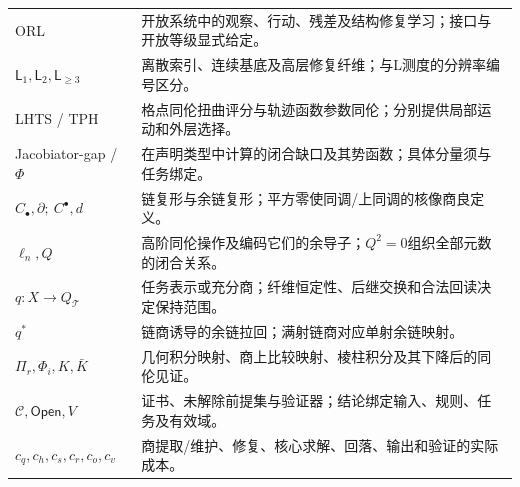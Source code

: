 \documentclass[11pt,a4paper]{article}
\theoremstyle{plain}
\theoremstyle{definition}
\theoremstyle{remark}
\begin{document}
\begin{CJK*}{UTF8}{gkai}
\begin{longtable}{P{0.30\textwidth}P{0.64\textwidth}}
ORL & 开放系统中的观察、行动、残差及结构修复学习；接口与开放等级显式给定。\\
$\mathsf L_1,\mathsf L_2,\mathsf L_{\ge3}$ & 离散索引、连续基底及高层修复纤维；与L测度的分辨率编号区分。\\
LHTS / TPH & 格点同伦扭曲评分与轨迹函数参数同伦；分别提供局部运动和外层选择。\\
Jacobiator-gap / $\Phi$ & 在声明类型中计算的闭合缺口及其势函数；具体分量须与任务绑定。\\
$C_\bullet,\partial;\ C^\bullet,d$ & 链复形与余链复形；平方零使同调/上同调的核像商良定义。\\
$\ell_n,Q$ & 高阶同伦操作及编码它们的余导子；$Q^2=0$组织全部元数的闭合关系。\\
$q:X\to Q_{\mathcal T}$ & 任务表示或充分商；纤维恒定性、后继交换和合法回读决定保持范围。\\
$q^*$ & 链商诱导的余链拉回；满射链商对应单射余链映射。\\
$\Pi_r,\Phi_i,K,\bar K$ & 几何积分映射、商上比较映射、棱柱积分及其下降后的同伦见证。\\
$\mathcal C,\mathsf{Open},V$ & 证书、未解除前提集与验证器；结论绑定输入、规则、任务及有效域。\\
$c_q,c_h,c_s,c_r,c_o,c_v$ & 商提取/维护、修复、核心求解、回落、输出和验证的实际成本。\\
\end{longtable}
\normalsize
\clearpage

\end{CJK*}
\end{document}
